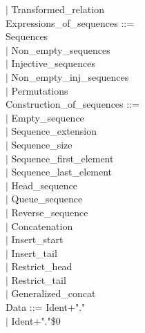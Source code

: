 \documentclass[12pt,a4paper,draft]{report}
\begin{document}
{\begin{sloppypar}
\hspace*{0.20in} $|$  Transformed\_relation\\
Expressions\_of\_sequences ::= \\
   Sequences\\
\hspace*{0.20in} $|$  Non\_empty\_sequences\\
\hspace*{0.20in} $|$  Injective\_sequences\\
\hspace*{0.20in} $|$  Non\_empty\_inj\_sequences\\
\hspace*{0.20in} $|$  Permutations\\
Construction\_of\_sequences ::= \\
\hspace*{0.20in} $|$  Empty\_sequence\\
\hspace*{0.20in} $|$  Sequence\_extension\\
\hspace*{0.20in} $|$  Sequence\_size\\
\hspace*{0.20in} $|$  Sequence\_first\_element\\
\hspace*{0.20in} $|$  Sequence\_last\_element\\
\hspace*{0.20in} $|$  Head\_sequence\\
\hspace*{0.20in} $|$  Queue\_sequence\\
\hspace*{0.20in} $|$  Reverse\_sequence\\
\hspace*{0.20in} $|$  Concatenation\\
\hspace*{0.20in} $|$  Insert\_start\\
\hspace*{0.20in} $|$  Insert\_tail\\
\hspace*{0.20in} $|$  Restrict\_head\\
\hspace*{0.20in} $|$  Restrict\_tail\\
\hspace*{0.20in} $|$  Generalized\_concat\\
Data    ::= Ident+"." \\
   \hspace*{0.20in} $|$ Ident+"."\$0 \\

\end{sloppypar}}
\end{document}
